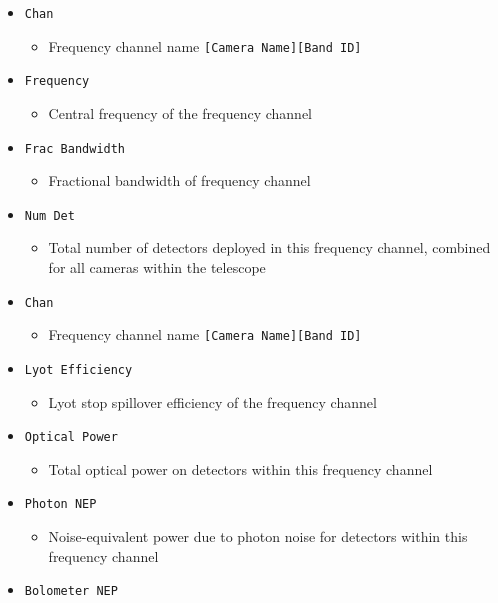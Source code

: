 \documentclass[11pt]{article} %
\begin{document}
\begin{itemize}[noitemsep,topsep=0pt]
	\item \texttt{Chan}
		\begin{itemize}[noitemsep,topsep=0pt]
		\item Frequency channel name \texttt{[Camera Name][Band ID]}
		\end{itemize}
	\item \texttt{Frequency}
		\begin{itemize}[noitemsep,topsep=0pt]
		\item Central frequency of the frequency channel
		\end{itemize}
	\item \texttt{Frac Bandwidth} 
		\begin{itemize}[noitemsep,topsep=0pt]
		\item Fractional bandwidth of frequency channel
		\end{itemize}
	\item \texttt{Num Det}
		\begin{itemize}[noitemsep,topsep=0pt]
		\item Total number of detectors deployed in this frequency channel, combined for all cameras within the telescope
		\end{itemize}
		\item \texttt{Chan}
		\begin{itemize}[noitemsep,topsep=0pt]
		\item Frequency channel name \texttt{[Camera Name][Band ID]}
		\end{itemize}
	\item \texttt{Lyot Efficiency}
		\begin{itemize}[noitemsep,topsep=0pt]
		\item Lyot stop spillover efficiency of the frequency channel
		\end{itemize}
	\item \texttt{Optical Power} 
		\begin{itemize}[noitemsep,topsep=0pt]
		\item Total optical power on detectors within this frequency channel
		\end{itemize}
	\item \texttt{Photon NEP}
		\begin{itemize}[noitemsep,topsep=0pt]
		\item Noise-equivalent power due to photon noise for detectors within this frequency channel
		\end{itemize}
	\item \texttt{Bolometer NEP}

\end{itemize}
\end{document}
